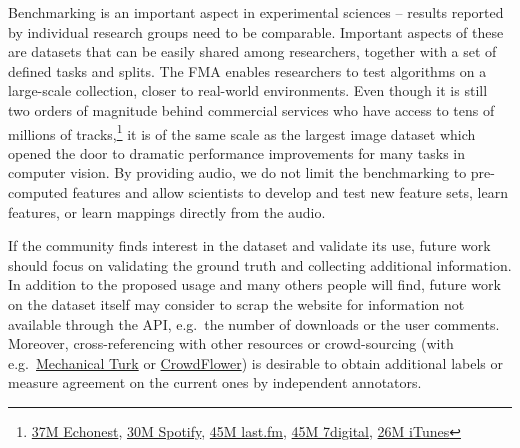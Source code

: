 \documentclass{article}
\newcommand{\todo}[1]{{\color{red} #1}}
\begin{document}

Benchmarking is an important aspect in experimental sciences -- results reported by individual research groups need to be comparable. Important aspects of these are datasets that can be easily shared among researchers, together with a set of defined tasks and splits. The FMA enables researchers to test algorithms on a large-scale collection, closer to real-world environments. Even though it is still two orders of magnitude behind commercial services who have access to tens of millions of tracks,\footnote{\href{http://the.echonest.com}{37M Echonest}, \href{https://en.wikipedia.org/wiki/Spotify}{30M Spotify}, \href{http://www.skilledtests.com/wiki/Last.fm_statistics}{45M last.fm}, \href{http://bupz.com/best-websites-to-buy-musics}{45M 7digital}, \href{https://www.apple.com/pr/library/2013/02/06iTunes-Store-Sets-New-Record-with-25-Billion-Songs-Sold.html}{26M iTunes}} it is of the same scale as the largest image dataset which opened the door to dramatic performance improvements for many tasks in computer vision.
By providing audio, we do not limit the benchmarking to pre-computed features and allow scientists to develop and test new feature sets, learn features, or learn mappings directly from the audio.


\todo{If the community finds interest in the dataset and validate its use, future work should focus on validating the ground truth and collecting additional information.}
In addition to the proposed usage and many others people will find, future work on the dataset itself may consider to scrap the website for information not available through the API, e.g.\ the number of downloads or the user comments. Moreover, cross-referencing with other resources or crowd-sourcing (with e.g.\ \href{https://www.mturk.com}{Mechanical Turk} or \href{https://www.crowdflower.com/}{CrowdFlower}) is desirable to obtain additional labels or measure agreement on the current ones by independent annotators.
\end{document}
